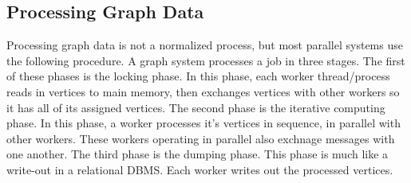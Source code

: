 \subsection*{Processing Graph Data}


Processing graph data is not a normalized process, but most parallel systems use the following procedure\cite{blogel}.
A graph system processes a job in three stages.
The first of these phases is the locking phase. In this phase, each worker thread/process reads in vertices to main memory, then exchanges vertices with other workers so it has all of its assigned vertices.
The second phase is the iterative computing phase. In this phase, a worker processes it's vertices in sequence, in parallel with other workers. These workers operating in parallel also exchnage messages with one another.
The third phase is the dumping phase. This phase is much like a write-out in a relational DBMS. Each worker writes out the processed vertices\cite{blogel}\cite{pregel}.





